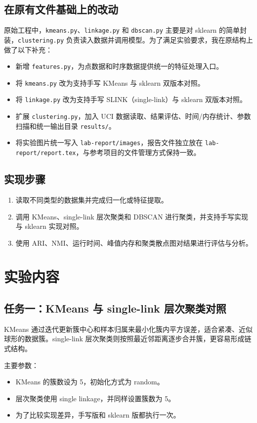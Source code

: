 \documentclass[12pt,a4paper]{ctexart}
\begin{document}
\subsection{在原有文件基础上的改动}
原始工程中，\texttt{kmeans.py}、\texttt{linkage.py} 和 \texttt{dbscan.py} 主要是对 sklearn 的简单封装，\texttt{clustering.py} 负责读入数据并调用模型。为了满足实验要求，我在原结构上做了以下补充：
\begin{itemize}
  \item 新增 \texttt{features.py}，为点数据和时序数据提供统一的特征处理入口。
  \item 将 \texttt{kmeans.py} 改为支持手写 KMeans 与 sklearn 双版本对照。
  \item 将 \texttt{linkage.py} 改为支持手写 SLINK（single-link）与 sklearn 双版本对照。
  \item 扩展 \texttt{clustering.py}，加入 UCI 数据读取、结果评估、时间/内存统计、参数扫描和统一输出目录 \texttt{results/}。
  \item 将实验图片统一写入 \texttt{lab-report/images}，报告文件独立放在 \texttt{lab-report/report.tex}，与参考项目的文件管理方式保持一致。
\end{itemize}

\subsection{实现步骤}
\begin{enumerate}
  \item 读取不同类型的数据集并完成归一化或特征提取。
  \item 调用 KMeans、single-link 层次聚类和 DBSCAN 进行聚类，并支持手写实现与 sklearn 实现对照。
  \item 使用 ARI、NMI、运行时间、峰值内存和聚类散点图对结果进行评估与分析。
\end{enumerate}

\section{实验内容}
\subsection{任务一：KMeans 与 single-link 层次聚类对照}
KMeans 通过迭代更新簇中心和样本归属来最小化簇内平方误差，适合紧凑、近似球形的数据簇。single-link 层次聚类则按照最近邻距离逐步合并簇，更容易形成链式结构。

主要参数：
\begin{itemize}
  \item KMeans 的簇数设为 5，初始化方式为 random。
  \item 层次聚类使用 single linkage，并同样设置簇数为 5。
  \item 为了比较实现差异，手写版和 sklearn 版都执行一次。
\end{itemize}
\end{document}

